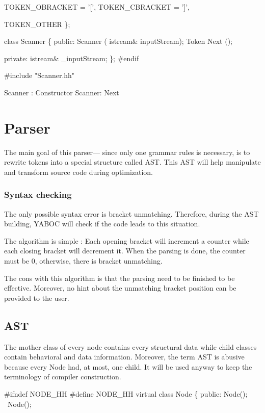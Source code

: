        TOKEN_OBRACKET  = '[',
        TOKEN_CBRACKET  = ']',

        TOKEN_OTHER
\};

class Scanner \{
        public:
                Scanner ( istream& inputStream);
                Token Next ();

        private:
                istream& _inputStream;
\};
#endif
\nwendcode{}\nwdocspar

\nwenddocs{}\endmoddef\nwstartdeflinemarkup\nwenddeflinemarkup
#include "Scanner.hh"

\LA{}Scanner : Constructor\RA{}
\LA{}Scanner: Next\RA{}
\nwendcode{}\nwdocspar
\nwenddocs{}\section{Parser}
The main goal of this parser--- since only one grammar rules is necessary, is to rewrite tokens into a special structure called \gls{AST}. This \gls{AST} will help manipulate and transform source code during optimization. 

\subsubsection{Syntax checking}
The only possible syntax error is bracket unmatching. Therefore, during the \gls{AST} building, YABOC will check if the code leads to this situation.

The algorithm is simple : Each opening bracket will increment a counter while each closing bracket will decrement it. When the parsing is done, the counter must be $0$, otherwise, there is bracket unmatching. 

\newpar The cons with this algorithm is that the parsing need to be finished to be effective. Moreover, no hint about the unmatching bracket position can be provided to the user.

\subsection{AST}
The mother class of every node contains every structural data while child classes contain behavioral and data information. Moreover, the term \gls{AST} is abusive because every Node had, at most, one child. It will be used anyway to keep the terminology of compiler construction.

\nwenddocs{}\endmoddef\nwstartdeflinemarkup\nwenddeflinemarkup
#ifndef NODE_HH
#define NODE_HH
virtual class Node \{
        public:
                Node();
                ~Node();

